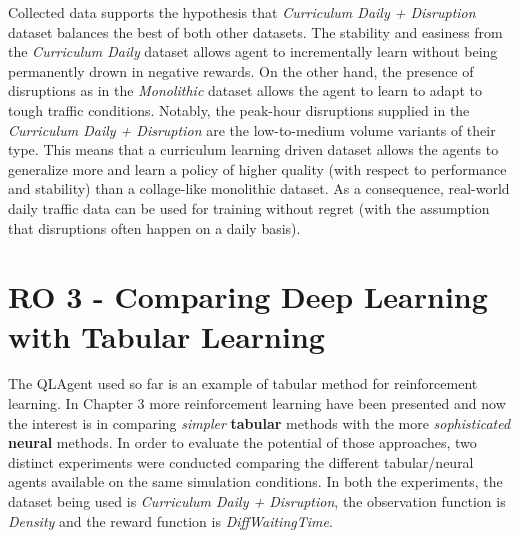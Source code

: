 Collected data supports the hypothesis that \textit{Curriculum Daily + Disruption} dataset balances the best of both other datasets.
The stability and easiness from the \textit{Curriculum Daily} dataset allows agent to incrementally learn without being permanently drown in negative rewards.
On the other hand, the presence of disruptions as in the \textit{Monolithic} dataset allows the agent to learn to adapt to tough traffic conditions.
Notably, the peak-hour disruptions supplied in the \textit{Curriculum Daily + Disruption} are the low-to-medium volume variants of their type.
This means that a curriculum learning driven dataset allows the agents to generalize more and learn a policy of higher quality (with respect to performance and stability) than a collage-like monolithic dataset.
As a consequence, real-world daily traffic data can be used for training without regret (with the assumption that disruptions often happen on a daily basis).



\section{RO 3 - Comparing Deep Learning with Tabular Learning}

The QLAgent used so far is an example of tabular method for reinforcement learning.
In Chapter 3 more reinforcement learning have been presented and now the interest is in comparing \textit{simpler} \textbf{tabular} methods with the more \textit{sophisticated} \textbf{neural} methods.
In order to evaluate the potential of those approaches, two distinct experiments were conducted comparing the different tabular/neural agents available on the same simulation conditions.
In both the experiments, the dataset being used is \textit{Curriculum Daily + Disruption}, the observation function is \textit{Density} and the reward function is \textit{DiffWaitingTime}.

